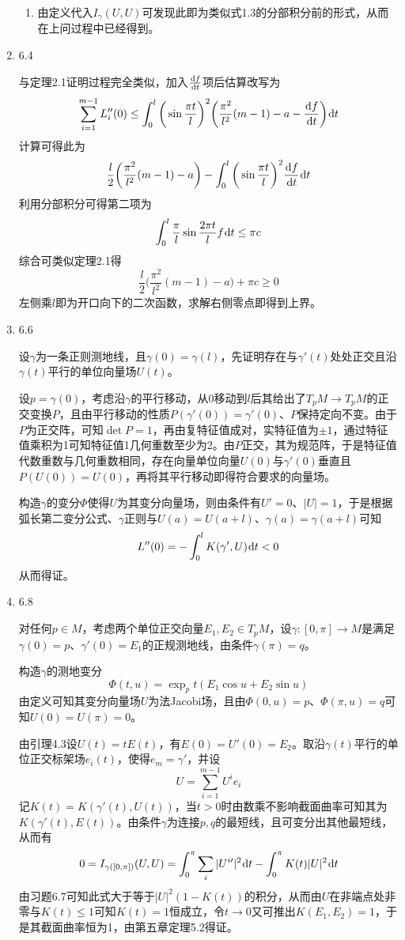 \documentclass[a4paper,UTF8,fontset=windows,10pt]{ctexart}
\newcommand*{\dr}{\hspace{0.07em}\mathrm{d}}
\begin{document}
\begin{enumerate}
\begin{enumerate}[(1)]
        \item 由定义代入$I_\gamma(U,U)$可发现此即为类似式1.3的分部积分前的形式，从而在上问过程中已经得到。
    \end{enumerate}
    
    \item 6.4
    
    与定理2.1证明过程完全类似，加入$\frac{\dr f}{\dr t}$项后估算改写为
    $$\sum_{i=1}^{m-1}L_i''(0)\le\int_0^l\bigg(\sin\frac{\pi t}{l}\bigg)^2\bigg(\frac{\pi^2}{l^2}(m-1)-a-\frac{\dr f}{\dr t}\bigg)\dr t$$
    计算可得此为
    $$\frac{l}{2}\bigg(\frac{\pi^2}{l^2}(m-1)-a\bigg)-\int_0^l\bigg(\sin\frac{\pi t}{l}\bigg)^2\frac{\dr f}{\dr t}\dr t$$
    利用分部积分可得第二项为
    $$\int_0^l\frac{\pi}{l}\sin\frac{2\pi t}{l}f\dr t\le\pi c$$
    综合可类似定理2.1得
    $$\frac{l}{2}\bigg(\frac{\pi^2}{l^2}(m-1)-a\bigg)+\pi c\ge0$$
    左侧乘$l$即为开口向下的二次函数，求解右侧零点即得到上界。
    
    \item 6.6
    
    设$\gamma$为一条正则测地线，且$\gamma(0)=\gamma(l)$，先证明存在与$\gamma'(t)$处处正交且沿$\gamma(t)$平行的单位向量场$U(t)$。
    
    设$p=\gamma(0)$，考虑沿$\gamma$的平行移动，从0移动到$l$后其给出了$T_pM\to T_pM$的正交变换$P$，且由平行移动的性质$P(\gamma'(0))=\gamma'(0)$、$P$保持定向不变。由于$P$为正交阵，可知$\det P=1$，再由复特征值成对，实特征值为$\pm1$，通过特征值乘积为1可知特征值1几何重数至少为2。由$P$正交，其为规范阵，于是特征值代数重数与几何重数相同，存在向量单位向量$U(0)$与$\gamma'(0)$垂直且$P(U(0))=U(0)$，再将其平行移动即得符合要求的向量场。
    
    构造$\gamma$的变分$\Phi$使得$U$为其变分向量场，则由条件有$U'=0$、$|U|=1$，于是根据弧长第二变分公式、$\gamma$正则与$U(a)=U(a+l)$、$\gamma(a)=\gamma(a+l)$可知
    $$L''(0)=-\int_0^lK(\gamma',U)\dr t<0$$
    从而得证。
    
    \item 6.8
    
    对任何$p\in M$，考虑两个单位正交向量$E_1,E_2\in T_pM$，设$\gamma:[0,\pi]\to M$是满足$\gamma(0)=p$、$\gamma'(0)=E_1$的正规测地线，由条件$\gamma(\pi)=q$。
    
    构造$\gamma$的测地变分
    $$\Phi(t,u)=\exp_p t(E_1\cos u+E_2\sin u)$$
    由定义可知其变分向量场$U$为法Jacobi场，且由$\Phi(0,u)=p$、$\Phi(\pi,u)=q$可知$U(0)=U(\pi)=0$。
    
    由引理4.3设$U(t)=tE(t)$，有$E(0)=U'(0)=E_2$。取沿$\gamma(t)$平行的单位正交标架场$e_i(t)$，使得$e_m=\gamma'$，并设
    $$U=\sum_{i=1}^{m-1}U^ie_i$$
    记$K(t)=K(\gamma'(t),U(t))$，当$t>0$时由数乘不影响截面曲率可知其为$K(\gamma'(t),E(t))$。由条件$\gamma$为连接$p,q$的最短线，且可变分出其他最短线，从而有
    $$0=I_{\gamma([0,\pi])}(U,U)=\int_0^\pi\sum_i|U^{i\prime}|^2\dr t-\int_0^\pi K(t)|U|^2\dr t$$
    由习题6.7可知此式大于等于$|U|^2(1-K(t))$的积分，从而由$U$在非端点处非零与$K(t)\le1$可知$K(t)=1$恒成立，令$t\to0$又可推出$K(E_1,E_2)=1$，于是其截面曲率恒为1，由第五章定理5.2得证。
    

\end{enumerate}
\end{document}
